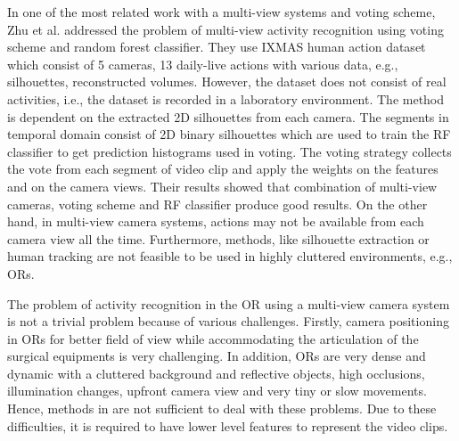\documentclass[a4paper, 10pt, conference]{ieeeconf}      %
\begin{document}
 	In one of the most related work with a multi-view systems and voting scheme, Zhu et al. \cite{c22} addressed the problem of multi-view activity recognition using voting scheme and random forest classifier. They use IXMAS human action dataset \cite{c24} which consist of 5 cameras, 13 daily-live actions with various data, e.g., silhouettes, reconstructed volumes. However, the dataset does not consist of real activities, i.e., the dataset is recorded in a laboratory environment. The method is dependent on the extracted 2D silhouettes from each camera. The segments in temporal domain consist of 2D binary silhouettes which are used to train the RF classifier to get prediction histograms used in voting. The voting strategy collects the vote from each segment of video clip and apply the weights on the features and on the camera views. Their results showed that combination of multi-view cameras, voting scheme and RF classifier produce good results. On the other hand, in multi-view camera systems, actions may not be available from each camera view all the time. Furthermore, methods, like silhouette extraction or human tracking are not feasible to be used in highly cluttered environments, e.g., ORs.
    
    The problem of activity recognition in the OR using a multi-view camera system is not a trivial problem because of various challenges. Firstly, camera positioning in ORs for better field of view while accommodating the articulation of the surgical equipments is very challenging. In addition, ORs are very dense and dynamic with a cluttered background and reflective objects, high occlusions, illumination changes, upfront camera view and very tiny or slow movements. Hence, methods in \cite{c11, c13, c20} are not sufficient to deal with these problems. Due to these difficulties, it is required to have lower level features to represent the video clips.
    
    
\end{document}
